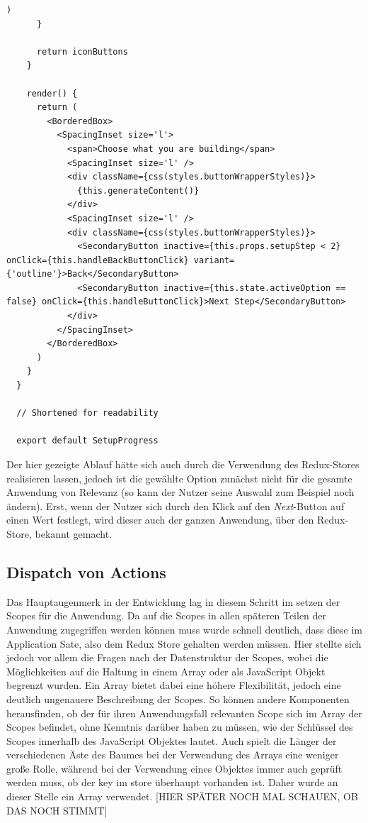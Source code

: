 \begin{lstlisting}[caption=Die Komponente \texttt{SetupProgress} in gekürzter Form, label=lst:setup]
        )
      }

      return iconButtons
    }

    render() {
      return (
        <BorderedBox>
          <SpacingInset size='l'>
            <span>Choose what you are building</span>
            <SpacingInset size='l' />
            <div className={css(styles.buttonWrapperStyles)}>
              {this.generateContent()}
            </div>
            <SpacingInset size='l' />
            <div className={css(styles.buttonWrapperStyles)}>
              <SecondaryButton inactive={this.props.setupStep < 2} onClick={this.handleBackButtonClick} variant={'outline'}>Back</SecondaryButton>
              <SecondaryButton inactive={this.state.activeOption == false} onClick={this.handleButtonClick}>Next Step</SecondaryButton>
            </div>
          </SpacingInset>
        </BorderedBox>
      )
    }
  }

  // Shortened for readability

  export default SetupProgress
\end{lstlisting}

Der hier gezeigte Ablauf hätte sich auch durch die Verwendung des Redux-Stores realisieren lassen, jedoch ist die gewählte Option zunächst nicht für die gesamte Anwendung von Relevanz (so kann der Nutzer seine Auswahl zum Beispiel noch ändern). Erst, wenn der Nutzer sich durch den Klick auf den \textit{Next}-Button auf einen Wert festlegt, wird dieser auch der ganzen Anwendung, über den Redux-Store, bekannt gemacht.

\subsection{Dispatch von Actions}
Das Hauptaugenmerk in der Entwicklung lag in diesem Schritt im setzen der Scopes für die Anwendung. Da auf die Scopes in allen späteren Teilen der Anwendung zugegriffen werden können muss wurde schnell deutlich, dass diese im Application Sate, also dem Redux Store gehalten werden müssen. Hier stellte sich jedoch vor allem die Fragen nach der Datenstruktur der Scopes, wobei die Möglichkeiten auf die Haltung in einem Array oder als JavaScript Objekt begrenzt wurden.
Ein Array bietet dabei eine höhere Flexibilität, jedoch eine deutlich ungenauere Beschreibung der Scopes. So können andere Komponenten herausfinden, ob der für ihren Anwendungsfall relevanten Scope sich im Array der Scopes befindet, ohne Kenntnis darüber haben zu müssen, wie der Schlüssel des Scopes innerhalb des JavaScript Objektes lautet. Auch spielt die Länger der verschiedenen Äste des Baumes bei der Verwendung des Arrays eine weniger große Rolle, während bei der Verwendung eines Objektes immer auch geprüft werden muss, ob der key im store überhaupt vorhanden ist. Daher wurde an dieser Stelle ein Array verwendet.
[HIER SPÄTER NOCH MAL SCHAUEN, OB DAS NOCH STIMMT]

